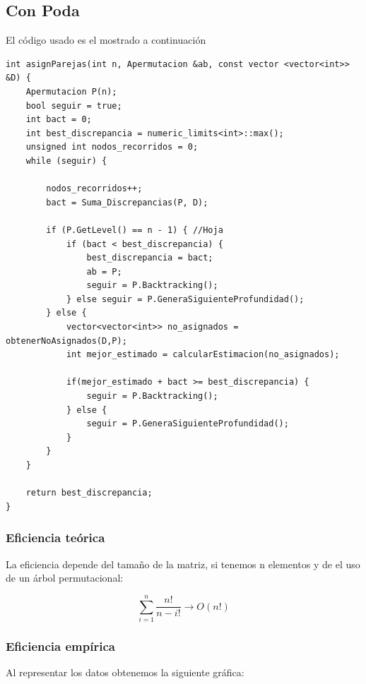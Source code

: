 \subsection{Con Poda}
El código usado es el mostrado a continuación

\begin{lstlisting}
int asignParejas(int n, Apermutacion &ab, const vector <vector<int>> &D) {
    Apermutacion P(n);
    bool seguir = true;
    int bact = 0;
    int best_discrepancia = numeric_limits<int>::max();
    unsigned int nodos_recorridos = 0;
    while (seguir) {

        nodos_recorridos++;
        bact = Suma_Discrepancias(P, D);

        if (P.GetLevel() == n - 1) { //Hoja
            if (bact < best_discrepancia) {
                best_discrepancia = bact;
                ab = P;
                seguir = P.Backtracking();
            } else seguir = P.GeneraSiguienteProfundidad();
        } else {
            vector<vector<int>> no_asignados = obtenerNoAsignados(D,P);
            int mejor_estimado = calcularEstimacion(no_asignados);

            if(mejor_estimado + bact >= best_discrepancia) {
                seguir = P.Backtracking();
            } else {
                seguir = P.GeneraSiguienteProfundidad();
            }
        }
    }

    return best_discrepancia;
}
\end{lstlisting}


\subsubsection{Eficiencia teórica}

La eficiencia depende del tamaño de la matriz, si tenemos n elementos y de el uso de un árbol permutacional:

  \begin{equation}
      \sum_{i=1}^{n} \dfrac{n!}{n - i!} \rightarrow O(n!)
  \end{equation}

\subsubsection{Eficiencia empírica}

Al representar los datos obtenemos la siguiente gráfica:

